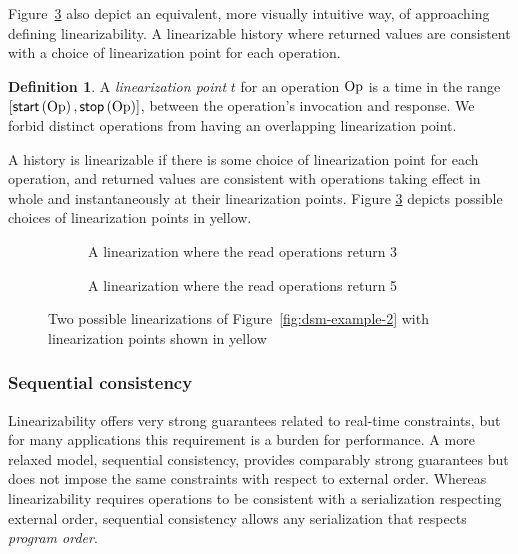 \documentclass[]             %
{NASA}                       %
\theoremstyle{definition}
\newtheorem{definition}[theorem]{Definition}
\begin{document}
Figure~\ref{fig:dsm-example-2-linearizations} also depict an
equivalent, more visually intuitive way, of approaching defining
linearizability. A linearizable history where returned values are
consistent with a choice of linearization point for each operation.
\begin{definition}
  A \emph{linearization point} $t$ for an operation $\mathrm{Op}$ is a time in
  the range $[\mathsf{start}\left(\mathrm{Op}\right), \mathsf{stop}\left(\mathrm{Op}\right)]$, between the operation's
  invocation and response. We forbid distinct operations from having
  an overlapping linearization point.
\end{definition}

A history is linearizable if there is some choice of linearization
point for each operation, and returned values are consistent with
operations taking effect in whole and instantaneously at their
linearization points. Figure \ref{fig:dsm-example-2-linearizations}
depicts possible choices of linearization points in yellow.

\begin{figure}
  \begin{subfigure}{1\textwidth}
    \setlength\belowcaptionskip{4ex}
    \centering
    
    \caption{A linearization where the read operations return 3}
    \label{fig:dsm-example-2-linearizations-1}
  \end{subfigure}
  \begin{subfigure}{1\textwidth}
    
        \caption{A linearization where the read operations return 5}
    \label{fig:dsm-example-2-linearizations-b}
  \end{subfigure}
  \caption{Two possible linearizations of Figure~\ref{fig:dsm-example-2} with linearization points shown in yellow}
  \label{fig:dsm-example-2-linearizations}
\end{figure}

\subsubsection{Sequential consistency}
\label{sequential-consistency}

Linearizability offers very strong guarantees related to real-time
constraints, but for many applications this requirement is a burden
for performance. A more relaxed model, sequential consistency,
provides comparably strong guarantees but does not impose the same
constraints with respect to external order. Whereas linearizability
requires operations to be consistent with a serialization respecting
external order, sequential consistency allows any serialization that
respects \emph{program order}.
\end{document}
